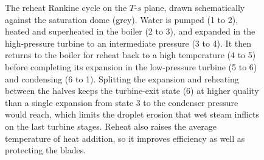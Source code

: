 \begin{figure}[htbp]
\caption[Reheat Rankine cycle on the temperature-entropy plane]{The reheat
Rankine cycle on the $T$-$s$ plane, drawn schematically against the saturation
dome (grey). Water is pumped (1 to 2), heated and superheated in the boiler
(2 to 3), and expanded in the high-pressure turbine to an intermediate
pressure (3 to 4). It then returns to the boiler for reheat back to a high
temperature (4 to 5) before completing its expansion in the low-pressure
turbine (5 to 6) and condensing (6 to 1). Splitting the expansion and
reheating between the halves keeps the turbine-exit state (6) at higher
quality than a single expansion from state 3 to the condenser pressure would
reach, which limits the droplet erosion that wet steam inflicts on the last
turbine stages. Reheat also raises the average temperature of heat addition,
so it improves efficiency as well as protecting the blades.}
\label{fig:vol04ch03:reheat-rankine-ts}
\end{figure}
